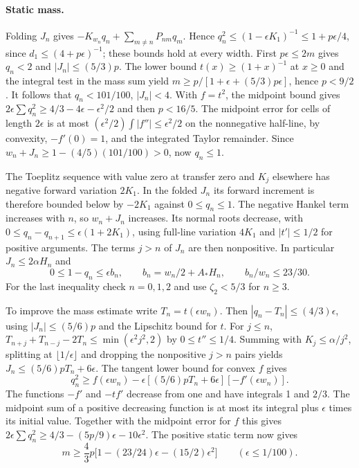 \documentclass[11pt]{article}
\begin{document}
\paragraph{Static mass.}
Folding $J_n$ gives $-K_{w_n}q_n+\sum_{m\ne n}P_{nm}q_m$. Hence $q_n^2\le(1-\epsilon K_1)^{-1}\le1+p\epsilon/4$, since $d_1\le(4+p\epsilon)^{-1}$; these bounds hold at every width. First $p\epsilon\le2m$ gives $q_n<2$ and $|J_n|\le(5/3)p$. The lower bound $t(x)\ge(1+x)^{-1}$ at $x\ge0$ and the integral test in the mass sum yield $m\ge p/[1+\epsilon+(5/3)p\epsilon]$, hence $p<9/2$. It follows that $q_n<101/100$, $|J_n|<4$. With $f=t^2$, the midpoint bound gives $2\epsilon\sum q_n^2\ge4/3-4\epsilon-\epsilon^2/2$ and then $p<16/5$. The midpoint error for cells of length $2\epsilon$ is at most $(\epsilon^2/2)\int |f''|\le\epsilon^2/2$ on the nonnegative half-line, by convexity, $-f'(0)=1$, and the integrated Taylor remainder. Since $w_n+J_n\ge1-(4/5)(101/100)>0$, now $q_n\le1$.

The Toeplitz sequence with value zero at transfer zero and $K_j$ elsewhere has negative forward variation $2K_1$. In the folded $J_n$ its forward increment is therefore bounded below by $-2K_1$ against $0\le q_n\le1$. The negative Hankel term increases with $n$, so $w_n+J_n$ increases. Its normal roots decrease, with $0\le q_n-q_{n+1}\le\epsilon(1+2K_1)$, using full-line variation $4K_1$ and $|t'|\le1/2$ for positive arguments. The terms $j>n$ of $J_n$ are then nonpositive. In particular $J_n\le2\alpha H_n$ and
\begin{equation}\label{eq:weight}
 0\le1-q_n\le\epsilon b_n,\qquad b_n=w_n/2+A_*H_n,\qquad b_n/w_n\le23/30.
\end{equation}
For the last inequality check $n=0,1,2$ and use $\zeta_2<5/3$ for $n\ge3$.

To improve the mass estimate write $T_n=t(\epsilon w_n)$. Then $|q_n-T_n|\le(4/3)\epsilon$, using $|J_n|\le(5/6)p$ and the Lipschitz bound for $t$. For $j\le n$, $T_{n+j}+T_{n-j}-2T_n\le\min(\epsilon^2j^2,2)$ by $0\le t''\le1/4$. Summing with $K_j\le\alpha/j^2$, splitting at $\lfloor1/\epsilon\rfloor$ and dropping the nonpositive $j>n$ pairs yields $J_n\le(5/6)pT_n+6\epsilon$. The tangent lower bound for convex $f$ gives
\[
 q_n^2\ge f(\epsilon w_n)-\epsilon[(5/6)pT_n+6\epsilon][-f'(\epsilon w_n)].
\]
The functions $-f'$ and $-tf'$ decrease from one and have integrals 1 and $2/3$. The midpoint sum of a positive decreasing function is at most its integral plus $\epsilon$ times its initial value. Together with the midpoint error for $f$ this gives $2\epsilon\sum q_n^2\ge4/3-(5p/9)\epsilon-10\epsilon^2$. The positive static term now gives
\begin{equation}\label{eq:mass}
 m\ge \frac43p\big[1-(23/24)\epsilon-(15/2)\epsilon^2\big]
 \qquad(\epsilon\le1/100).
\end{equation}
\end{document}
